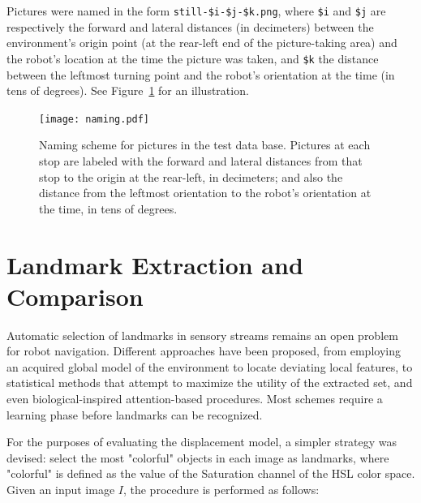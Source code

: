 \documentclass[twocolumn, 9pt]{jsproceedings}
\begin{document}
Pictures were named in the form {\tt still-\$i-\$j-\$k.png}, where {\tt \$i} and {\tt \$j} are respectively the forward and lateral distances (in decimeters) between the environment's origin point (at the rear-left end of the picture-taking area) and the robot's location at the time the picture was taken, and {\tt \$k} the distance between the leftmost turning point and the robot's orientation at the time (in tens of degrees). See Figure~\ref{fig:naming} for an illustration.

\begin{figure}[h!]
\texttt{[image: naming.pdf]}
\caption{Naming scheme for pictures in the test data base. Pictures at each stop are labeled with the forward and lateral distances from that stop to the origin at the rear-left, in decimeters; and also the distance from the leftmost orientation to the robot's orientation at the time, in tens of degrees.}
\label{fig:naming}
\end{figure}

\section{Landmark Extraction and Comparison}

Automatic selection of landmarks in sensory streams remains an open problem for robot navigation. Different approaches have been proposed, from employing an acquired global model of the environment to locate deviating local features, to statistical methods that attempt to maximize the utility of the extracted set, and even biological-inspired attention-based procedures. Most schemes require a learning phase before landmarks can be recognized.

For the purposes of evaluating the displacement model, a simpler strategy was devised: select the most "colorful" objects in each image as landmarks, where "colorful" is defined as the value of the Saturation channel of the HSL color space. Given an input image \(I\), the procedure is performed as follows:
\end{document}
